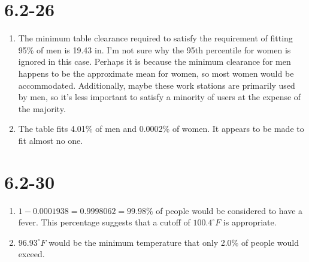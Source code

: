 \documentclass[12pt,fleqn]{article}
\newcommand{\chapter}{6.2}
\newcommand{\problem}[1]{\vspace{5ex}\section*{\chapter-#1}}
\begin{document}
\problem{26}
\begin{enumerate}[label=\alph*.]
\item The minimum table clearance required to satisfy the requirement of fitting 95\% of men is 19.43 in. I'm not sure why the 95th percentile for women is ignored in this case. Perhaps it is because the minimum clearance for men happens to be the approximate mean for women, so most women would be accommodated. Additionally, maybe these work stations are primarily used by men, so it's less important to satisfy a minority of users at the expense of the majority.

\item The table fits 4.01\% of men and 0.0002\% of women. It appears to be made to fit almost no one.
\end{enumerate}


\problem{30}
\begin{enumerate}[label=\alph*.]
\item $1 - 0.0001938 = 0.9998062 = 99.98\%$ of people would be considered to have a fever. This percentage suggests that a cutoff of $100.4^\circ F$ is appropriate.

\item $96.93^\circ F$ would be the minimum temperature that only 2.0\% of people would exceed.
\end{enumerate}
\end{document}
